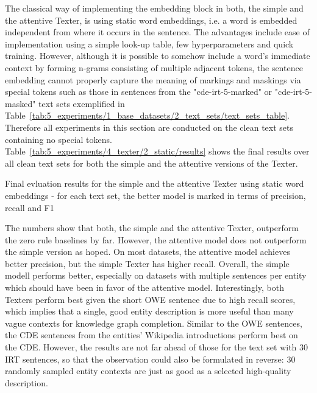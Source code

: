 The classical way of implementing the embedding block in both, the simple and the attentive Texter, is using static word embeddings, i.e. a word is embedded independent from where it occurs in the sentence. The advantages include ease of implementation using a simple look-up table, few hyperparameters and quick training. However, although it is possible to somehow include a word's immediate context by forming n-grams consisting of multiple adjacent tokens, the sentence embedding cannot properly capture the meaning of markings and maskings via special tokens such as those in sentences from the "cde-irt-5-marked" or "cde-irt-5-masked" text sets exemplified in Table~\ref{tab:5_experiments/1_base_datasets/2_text_sets/text_sets_table}. Therefore all experiments in this section are conducted on the clean text sets containing no special tokens. Table~\ref{tab:5_experiments/4_texter/2_static/results} shows the final results over all clean text sets for both the simple and the attentive versions of the Texter.

\begin{table}[h]
    \centering
    
    \caption{Final evluation results for the simple and the attentive Texter using static word embeddings - for each text set, the better model is marked in terms of precision, recall and F1}
    \label{tab:5_experiments/4_texter/2_static/results}
\end{table}

The numbers show that both, the simple and the attentive Texter, outperform the zero rule baselines by far. However, the attentive model does not outperform the simple version as hoped. On most datasets, the attentive model achieves better precision, but the simple Texter has higher recall. Overall, the simple modell performs better, especially on datasets with multiple sentences per entity which should have been in favor of the attentive model. Interestingly, both Texters perform best given the short OWE sentence due to high recall scores, which implies that a single, good entity description is more useful than many vague contexts for knowledge graph completion. Similar to the OWE sentences, the CDE sentences from the entities' Wikipedia introductions perform best on the CDE. However, the results are not far ahead of those for the text set with 30 IRT sentences, so that the observation could also be formulated in reverse: 30 randomly sampled entity contexts are just as good as a selected high-quality description.

